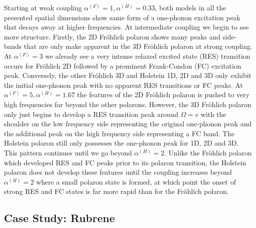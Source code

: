 Starting at weak coupling $\alpha^{(F)} = 1, \alpha^{(H)} = 0.33$, both models in all the presented spatial dimensions show same form of a one-phonon excitation peak that decays away at higher frequencies. At intermediate coupling we begin to see more structure. Firstly, the 2D Fr\"ohlich polaron shows many peaks and side-bands that are only make apparent in the 3D Fr\"ohlich polaron at strong coupling. At $\alpha^{(F)} = 3$ we already see a very intense relaxed excited state (RES) transition occurs for Fr\"ohlich 2D followed by a prominent Frank-Condon (FC) excitation peak. Conversely, the other Fr\"ohlich 3D and Holstein 1D, 2D and 3D only exhibit the initial one-phonon peak with no apparent RES transitions or FC peaks. At $\alpha^{(F)} = 5, \alpha^{(H)} = 1.67$ the features of the 2D Fr\"ohlich polaron is pushed to very high frequencies far beyond the other polarons. However, the 3D Fr\"ohlich polaron only just begins to develop a RES transition peak around $\Omega = v$ with the shoulder on the low frequency side representing the original one-phonon peak and the additional peak on the high frequency side representing a FC band. The Holstein polaron still only possesses the one-phonon peak for 1D, 2D and 3D. This pattern continues until we go beyond $\alpha^{(H)} = 2$. Unlike the Fr\"ohlich polaron which developed RES and FC peaks prior to its polaron transition, the Holstein polaron does not develop these features until the coupling increases beyond $\alpha^{(H)} = 2$ where a small polaron state is formed, at which point the onset of strong RES and FC states is far more rapid than for the Fr\"ohlich polaron. 

\subsection{Case Study: Rubrene}


